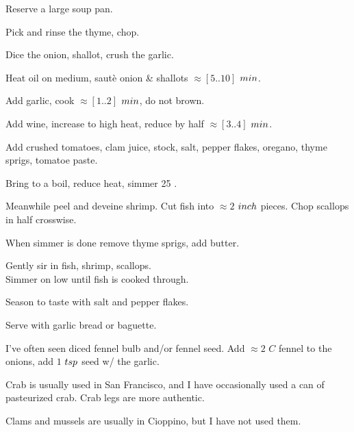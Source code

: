 \begin{preparation}
\item Reserve a large soup pan.

\item Pick and rinse the thyme, chop.

\item Dice the onion, shallot, crush the garlic.

\item Heat oil on medium, saut\`{e} onion \& shallots $\approx[5..10]$ $\minute$.

\item Add garlic, cook $\approx[1..2]$ $\minute$, do not brown.

\item Add wine, increase to high heat, reduce by half $\approx[3..4]$ $\minute$.

\item Add crushed tomatoes, clam juice, stock, salt, pepper flakes, oregano, thyme sprigs, tomatoe paste.

\item Bring to a boil, reduce heat, simmer 25 \minute.

\item Meanwhile peel and deveine shrimp.
	Cut fish into $\approx2$ $\inch$ pieces.
	Chop scallops in half crosswise.

\item When simmer is done remove thyme sprigs, add butter.

\item Gently sir in fish, shrimp, scallops.\\
	Simmer on low until fish is cooked through.

\item Season to taste with salt and pepper flakes.

\item Serve with garlic bread or baguette.
\end{preparation}


\begin{variation}
\item I've often seen diced fennel bulb and/or fennel seed.
	Add $\approx2$ $C$ fennel to the onions, add $1$ $\teaspoon$ seed w/ the garlic.

\item Crab is usually used in San Francisco, and I have occasionally used a can of pasteurized crab. Crab legs are more authentic.

\item Clams and mussels are usually in Cioppino, but I have not used them.
\end{variation}

\recipeend%
